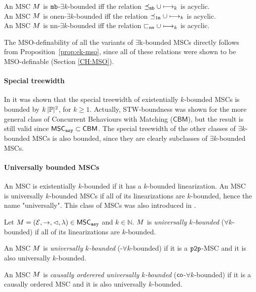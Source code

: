 \begin{proposition}\label{prop:ek-mso}
	An MSC $M$ is $\mathtt{mb}$-$\exists k$-bounded iff the relation $\preceq_{\mathtt{mb}} \cup \longmapsto_k$ is acyclic.\\
	An MSC $M$ is onen-$\exists k$-bounded iff the relation $\preceq_{\mathtt{1n}} \cup \longmapsto_k$ is acyclic.\\
	An MSC $M$ is nn-$\exists k$-bounded iff the relation $\sqsubset_{\mathsf{nn}} \cup \longmapsto_k$ is acyclic.
\end{proposition}

The MSO-definability of all the variants of $\exists$k-bounded MSCs directly follows from Proposition~\ref{prop:ek-mso}, since all of these relations were shown to be MSO-definable (Section \ref{CH:MSO}).

\paragraph*{Special treewidth}

In \cite[Lemma 5.37]{DBLP:journals/corr/abs-1904-06942} it was shown that the special treewidth of existentially $k$-bounded MSCs is bounded by $k\,|\mathbb{P}|^2$, for $k \ge 1$. Actually, STW-boundness was shown for the more general class of Concurrent Behaviours with Matching ($\mathsf{CBM}$), but the result is still valid since $\mathsf{MSC}_{\mathtt{asy}} \subset \mathsf{CBM}$. The special treewidth of the other classes of $\exists k$-bounded MSCs is also bounded, since they are clearly subclasses of $\exists k$-bounded MSCs.

\paragraph{\bf Universally bounded MSCs}

An MSC is existentially $k$-bounded if it has a $k$-bounded linearization. An MSC is universally $k$-bounded MSCs if all of its linearizations are $k$-bounded, hence the name "universally". This class of MSCs was also introduced in \cite{DBLP:conf/fossacs/LohreyM02}.

\begin{definition}\label{def:uk_bounded_msc}
	Let $M = (\mathcal{E}, \rightarrow, \lhd, \lambda) \in \mathsf{MSC}_{\mathtt{asy}}$ and $k \in \mathbb{N}$. $M$ is \emph{universally $k$-bounded} ($\forall k$-bounded) if all of its linearizations are $k$-bounded.
\end{definition}
\begin{definition}
	An MSC $M$ is \emph{\pp universally $k$-bounded} (\pp-$\forall k$-bounded) if it is a $\mathtt{p2p}$-MSC and it is also universally $k$-bounded.
\end{definition}
\begin{definition}
	An MSC $M$ is \emph{causally orderered universally $k$-bounded} ($\mathsf{co}$-$\forall k$-bounded) if it is a causally ordered MSC and it is also universally $k$-bounded.
\end{definition}

